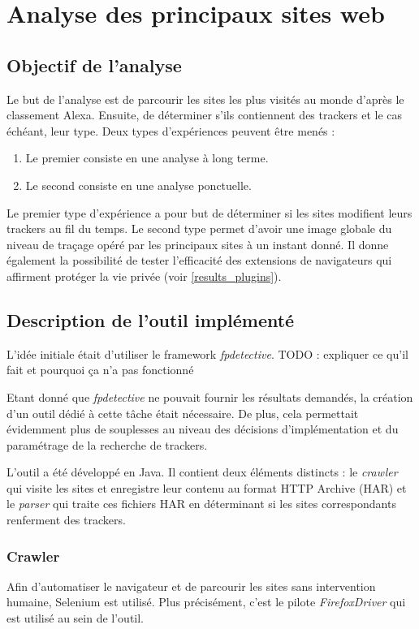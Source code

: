 \chapter{Analyse des principaux sites web}
\section{Objectif de l'analyse}
Le but de l'analyse est de parcourir les sites les plus visités au monde d'après le classement Alexa. Ensuite, de déterminer s'ils contiennent des trackers et le cas échéant, leur type. Deux types d'expériences peuvent être menés :
\begin{enumerate}
	\item Le premier consiste en une analyse à long terme.
	\item Le second consiste en une analyse ponctuelle.
\end{enumerate}

Le premier type d'expérience a pour but de déterminer si les sites modifient leurs trackers au fil du temps.
Le second type permet d'avoir une image globale du niveau de traçage opéré par les principaux sites à un instant donné. Il donne également la possibilité de tester l'efficacité des extensions de navigateurs qui affirment protéger la vie privée (voir \autoref{results_plugins}).

\section{Description de l'outil implémenté}
L'idée initiale était d'utiliser le framework \textit{fpdetective}. TODO : expliquer ce qu'il fait et pourquoi ça n'a pas fonctionné

Etant donné que \textit{fpdetective} ne pouvait fournir les résultats demandés, la création d'un outil dédié à cette tâche était nécessaire. De plus, cela permettait évidemment plus de souplesses au niveau des décisions d'implémentation et du paramétrage de la recherche de trackers.
\newline


L'outil a été développé en Java. Il contient deux éléments distincts : le \textit{crawler} qui visite les sites et enregistre leur contenu au format HTTP Archive (HAR) et le \textit{parser} qui traite ces fichiers HAR en déterminant si les sites correspondants renferment des trackers.

\subsection{Crawler}
Afin d'automatiser le navigateur et de parcourir les sites sans intervention humaine, Selenium \cite{selenium_homepage} est utilisé. Plus précisément, c'est le pilote \textit{FirefoxDriver} qui est utilisé au sein de l'outil.

